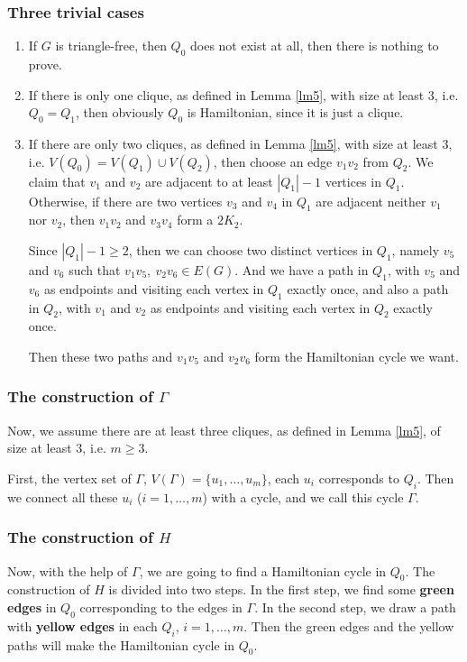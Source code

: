 \documentclass{amsart}
\theoremstyle{definition}
\begin{document}
\subsubsection{Three trivial cases}
\begin{enumerate}
\item If $G$ is triangle-free, then $Q_0$ does not exist at all, then there is nothing to prove.
\item If there is only one clique, as defined in Lemma \ref{lm5}, with size at least 3, i.e. $Q_0=Q_1$, then obviously $Q_0$ is Hamiltonian, since it is just a clique.
\item If there are only two cliques, as defined in Lemma \ref{lm5}, with size at least 3, i.e. $V(Q_0)=V(Q_1)\cup V(Q_2)$, then choose an edge $v_1v_2$ from $Q_2$. We claim that $v_1$ and $v_2$ are adjacent to at least $|Q_1|-1$ vertices in $Q_1$. Otherwise, if there are two vertices $v_3$ and $v_4$ in $Q_1$ are adjacent neither $v_1$ nor $v_2$, then $v_1v_2$ and $v_3v_4$ form a $2K_2$.

Since $|Q_1|-1\ge2$, then we can choose two distinct vertices in $Q_1$, namely $v_5$ and $v_6$ such that $v_1v_5,~v_2v_6\in E(G)$. And we have a path in  $Q_1$, with $v_5$ and $v_6$ as endpoints and visiting each vertex in $Q_1$ exactly once, and also a path in $Q_2$, with $v_1$ and $v_2$ as endpoints and visiting each vertex in $Q_2$ exactly once.

Then these two paths and $v_1v_5$ and $v_2v_6$ form the Hamiltonian cycle we want.
\end{enumerate}

\subsubsection{The construction of $\Gamma$}

Now, we assume there are at least three cliques, as defined in Lemma \ref{lm5}, of size at least 3, i.e. $m\ge3$.

First, the vertex set of $\Gamma$, $V(\Gamma)=\{u_1,\ldots,u_m\}$, each $u_i$ corresponds to $Q_i$. 
Then we connect all these $u_i$ ($i=1,\ldots,m$) with a cycle, and we call this cycle $\Gamma$.




\subsubsection{The construction of $H$}
Now, with the help of $\Gamma$, we are going to find a Hamiltonian cycle in $Q_0$. 
The construction of $H$ is divided into two steps. In the first step, we find some {\bf green edges} in $Q_0$ corresponding to the edges in $\Gamma$. In the second step, we draw a path with {\bf yellow edges} in each $Q_i$, $i=1,\ldots,m$. Then the green edges and the yellow paths will make the Hamiltonian cycle in $Q_0$.
\end{document}
